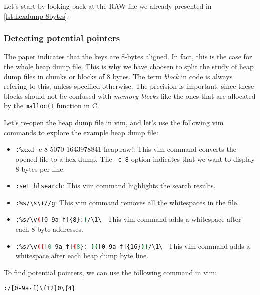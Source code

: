     Let's start by looking back at the RAW file we already presented in \autoref{lst:hexdump-8bytes}.

    \subsubsection{Detecting potential pointers}
    The paper  indicates that the keys are 8-bytes aligned. In fact, this is the case for the whole heap dump file. This is why we have choosen to split the study of heap dump files in chunks or blocks of 8 bytes. The term \textit{block} in code is always refering to this, unless specified otherwise. The precision is important, since these blocks should not be confused with \textit{memory blocks} like the ones that are allocated by the \lstinline[language=c]|malloc()| function in C.

    \begin{minipage}{\dimexpr\linewidth-20pt}
        Let's re-open the heap dump file in vim, and let's use the following vim commands to explore the example heap dump file:

        \begin{itemize} 
            \item \lstinline[language=bash]!:%!xxd -c 8  5070-1643978841-heap.raw!: This vim command converts the opened file to a hex dump. The \lstinline[language=bash]!-c 8! option indicates that we want to display 8 bytes per line.
            \item \lstinline[language=bash]!:set hlsearch!: This vim command highlights the search results.
            \item \lstinline[language=bash]!:%s/\s\+//g!: This vim command removes all the whitespaces in the file.
            \item \lstinline[language=bash]!:%s/\v([0-9a-f]{8}:)/\1\ ! This vim command adds a whitespace after each 8 byte addresses.
            \item \lstinline[language=bash]!:%s/\v(([0-9a-f]{8}: )([0-9a-f]{16}))/\1\ ! This vim command adds a whitespace after each heap dump byte line.
        \end{itemize}
    \end{minipage}

    To find potential pointers, we can use the following command in vim:
    \begin{lstlisting}[language=bash, caption={Vim command to find potential pointers}]
        :/[0-9a-f]\{12}0\{4}
    \end{lstlisting}

